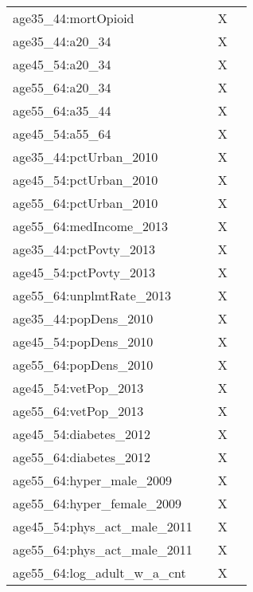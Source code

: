 \begin{table}[ht]
\begin{tabular}{llll}
  age35\_44:mortOpioid &  & X &  \\ 
  age35\_44:a20\_34 &  & X &  \\ 
  age45\_54:a20\_34 &  & X &  \\ 
  age55\_64:a20\_34 &  & X &  \\ 
  age55\_64:a35\_44 &  & X &  \\ 
  age45\_54:a55\_64 &  & X &  \\ 
  age35\_44:pctUrban\_2010 &  & X &  \\ 
  age45\_54:pctUrban\_2010 &  & X &  \\ 
  age55\_64:pctUrban\_2010 &  & X &  \\ 
  age55\_64:medIncome\_2013 &  & X &  \\ 
  age35\_44:pctPovty\_2013 &  & X &  \\ 
  age45\_54:pctPovty\_2013 &  & X &  \\ 
  age55\_64:unplmtRate\_2013 &  & X &  \\ 
  age35\_44:popDens\_2010 &  & X &  \\ 
  age45\_54:popDens\_2010 &  & X &  \\ 
  age55\_64:popDens\_2010 &  & X &  \\ 
  age45\_54:vetPop\_2013 &  & X &  \\ 
  age55\_64:vetPop\_2013 &  & X &  \\ 
  age45\_54:diabetes\_2012 &  & X &  \\ 
  age55\_64:diabetes\_2012 &  & X &  \\ 
  age55\_64:hyper\_male\_2009 &  & X &  \\ 
  age55\_64:hyper\_female\_2009 &  & X &  \\ 
  age45\_54:phys\_act\_male\_2011 &  & X &  \\ 
  age55\_64:phys\_act\_male\_2011 &  & X &  \\ 
  age55\_64:log\_adult\_w\_a\_cnt &  & X &  \\ 
   \hline
\end{tabular}
\endgroup
\caption{} 
\end{table}
